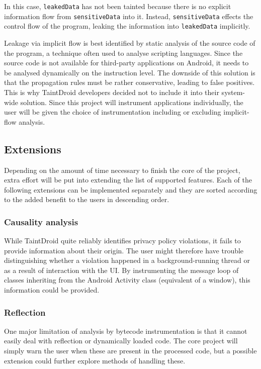 \documentclass[12pt]{article}
\begin{document}
In this case, \verb|leakedData| has not been tainted because there is 
no explicit information flow from \verb|sensitiveData| into it. Instead, 
\verb|sensitiveData| effects the control flow of the program, leaking
the information into \verb|leakedData| implicitly. 

Leakage via implicit flow is best identified by static analysis of the 
source code of the program, a technique often used to analyse scripting
languages. Since the source code is not available for third-party 
applications on Android, it needs to be analysed dynamically on the 
instruction level. The downside of this solution is that the propagation 
rules must be rather conservative, leading to false positives. This is 
why TaintDroid developers decided not to include it into their
system-wide solution. Since this project will instrument applications
individually, the user will be given the choice of instrumentation 
including or excluding implicit-flow analysis.

\subsection*{Extensions}

Depending on the amount of time necessary to finish the core of the project,
extra effort will be put into extending the list of supported features. Each 
of the following extensions can be implemented separately and they are 
sorted according to the added benefit to the users in descending order.

\subsubsection*{Causality analysis}

While TaintDroid quite reliably identifies privacy policy violations,
it fails to provide information about their origin. The user might therefore 
have trouble distinguishing whether a violation happened in a 
background-running thread or as a result of interaction with the UI. 
By instrumenting the message loop of classes inheriting from the Android 
Activity class (equivalent of a window), this information could be provided.

\subsubsection*{Reflection}

One major limitation of analysis by bytecode instrumentation is that it 
cannot easily deal with reflection or dynamically loaded code. The core
project will simply warn the user when these are present in the processed
code, but a possible extension could further explore methods of handling 
these.
\end{document}

